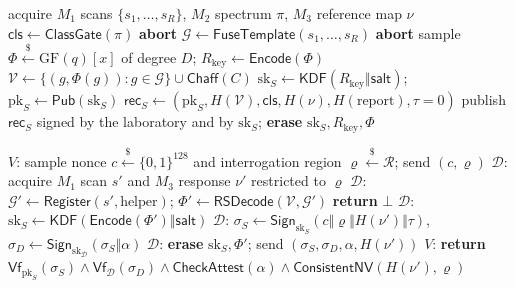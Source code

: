 \documentclass[10pt,twocolumn]{article}
\theoremstyle{remark}
\newcommand{\KDF}{\textsf{KDF}}
\newcommand{\Sign}{\textsf{Sign}}
\newcommand{\Vf}{\textsf{Vf}}
\newcommand{\bits}{\{0,1\}}
\begin{document}
\begin{algorithm}[H]
\caption{$\textsf{Enroll}(S)$ --- executed by a certifying laboratory}
\begin{algorithmic}[1]
\State acquire $M_1$ scans $\{s_1,\dots,s_R\}$, $M_2$ spectrum $\pi$, $M_3$ reference map $\nu$
\State $\mathsf{cls} \gets \textsf{ClassGate}(\pi)$ 
 \textbf{abort} \EndIf
\State $\mathcal{G} \gets \textsf{FuseTemplate}(s_1,\dots,s_R)$ 
 \textbf{abort}  \EndIf
\State sample $\Phi \xleftarrow{\$} \mathrm{GF}(q)[x]$ of degree $D$; $R_{\mathrm{key}} \gets \textsf{Encode}(\Phi)$
\State $\mathcal{V} \gets \{(g,\Phi(g)) : g \in \mathcal{G}\} \cup \textsf{Chaff}(C)$
\State $\mathrm{sk}_S \gets \KDF(R_{\mathrm{key}} \Vert \mathsf{salt})$; \; $\mathrm{pk}_S \gets \textsf{Pub}(\mathrm{sk}_S)$
\State $\mathsf{rec}_S \gets (\mathrm{pk}_S, H(\mathcal{V}), \mathsf{cls}, H(\nu), H(\text{report}), \tau{=}0)$
\State publish $\mathsf{rec}_S$ signed by the laboratory and by $\mathrm{sk}_S$; \textbf{erase} $\mathrm{sk}_S, R_{\mathrm{key}}, \Phi$
\end{algorithmic}
\end{algorithm}

\begin{algorithm}[H]
\caption{$\textsf{Verify}(S, \mathsf{rec}_S)$ --- verifier $V$ and attested device $\mathcal{D}$}
\begin{algorithmic}[1]
\State $V$: sample nonce $c \xleftarrow{\$} \bits^{128}$ and interrogation region $\varrho \xleftarrow{\$} \mathcal{R}$; send $(c,\varrho)$
\State $\mathcal{D}$: acquire $M_1$ scan $s'$ and $M_3$ response $\nu'$ restricted to $\varrho$
\State $\mathcal{D}$: $\mathcal{G}' \gets \textsf{Register}(s', \text{helper})$; \; $\Phi' \gets \textsf{RSDecode}(\mathcal{V}, \mathcal{G}')$
 \textbf{return} $\bot$ \EndIf
\State $\mathcal{D}$: $\mathrm{sk}_S \gets \KDF(\textsf{Encode}(\Phi') \Vert \mathsf{salt})$
\State $\mathcal{D}$: $\sigma_S \gets \Sign_{\mathrm{sk}_S}(c \Vert \varrho \Vert H(\nu') \Vert \tau)$, \;
       $\sigma_D \gets \Sign_{\mathrm{sk}_\mathcal{D}}(\sigma_S \Vert \alpha)$
\State $\mathcal{D}$: \textbf{erase} $\mathrm{sk}_S, \Phi'$; send $(\sigma_S, \sigma_D, \alpha, H(\nu'))$
\State $V$: \textbf{return} $\Vf_{\mathrm{pk}_S}(\sigma_S) \wedge \Vf_{\mathcal{D}}(\sigma_D)
       \wedge \textsf{CheckAttest}(\alpha) \wedge \textsf{ConsistentNV}(H(\nu'), \varrho)$
\end{algorithmic}
\end{algorithm}
\end{document}

